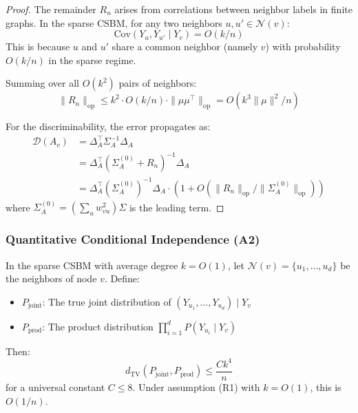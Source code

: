 \begin{proof}
The remainder $R_n$ arises from correlations between neighbor labels in finite graphs. In the sparse CSBM, for any two neighbors $u, u' \in \mathcal{N}(v)$:
\begin{equation}
    \mathrm{Cov}(Y_u, Y_{u'} \mid Y_v) = O(k/n)
\end{equation}
This is because $u$ and $u'$ share a common neighbor (namely $v$) with probability $O(k/n)$ in the sparse regime.

Summing over all $O(k^2)$ pairs of neighbors:
\begin{equation}
    \|R_n\|_{\mathrm{op}} \leq k^2 \cdot O(k/n) \cdot \|\mu \mu^\top\|_{\mathrm{op}} = O(k^3 \|\mu\|^2 / n)
\end{equation}

For the discriminability, the error propagates as:
\begin{align}
    \mathcal{D}(A_v) &= \Delta_A^\top \Sigma_A^{-1} \Delta_A \\
    &= \Delta_A^\top \left(\Sigma_A^{(0)} + R_n\right)^{-1} \Delta_A \\
    &= \Delta_A^\top (\Sigma_A^{(0)})^{-1} \Delta_A \cdot (1 + O(\|R_n\|_{\mathrm{op}} / \|\Sigma_A^{(0)}\|_{\mathrm{op}}))
\end{align}
where $\Sigma_A^{(0)} = (\sum_u w_{vu}^2) \Sigma$ is the leading term.
\end{proof}

\subsubsection{Quantitative Conditional Independence (A2)}

\begin{lemma}
\label{lem:A2_quantitative}
In the sparse CSBM with average degree $k = O(1)$, let $\mathcal{N}(v) = \{u_1, \ldots, u_d\}$ be the neighbors of node $v$. Define:
\begin{itemize}
    \item $P_{\mathrm{joint}}$: The true joint distribution of $(Y_{u_1}, \ldots, Y_{u_d}) \mid Y_v$
    \item $P_{\mathrm{prod}}$: The product distribution $\prod_{i=1}^d P(Y_{u_i} \mid Y_v)$
\end{itemize}

Then:
\begin{equation}
    d_{\mathrm{TV}}(P_{\mathrm{joint}}, P_{\mathrm{prod}}) \leq \frac{C k^4}{n}
\end{equation}
for a universal constant $C \leq 8$. Under assumption (R1) with $k = O(1)$, this is $O(1/n)$.
\end{lemma}

